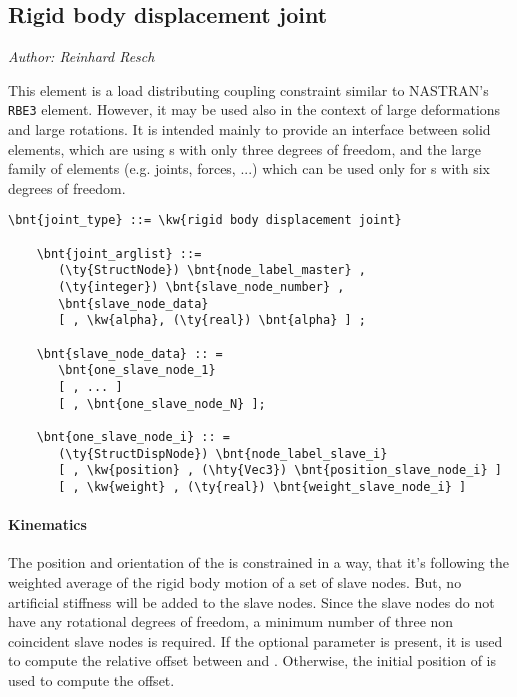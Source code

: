 \subsection{Rigid body displacement joint}
\label{sec:EL:STRUCT:JOINT:RIGID_BODY_DISP_JOINT}
\emph{Author: Reinhard Resch}

This element is a load distributing coupling constraint similar to NASTRAN's \texttt{RBE3} element.
However, it may be used also in the context of large deformations and large rotations.
It is intended mainly to provide an interface between solid elements, which are using s with only three degrees of freedom,
and the large family of elements (e.g. joints, forces, ...) which can be used only for s with six degrees of freedom.

\begin{Verbatim}[commandchars=\\\{\}]
    \bnt{joint_type} ::= \kw{rigid body displacement joint}

    \bnt{joint_arglist} ::=
       (\ty{StructNode}) \bnt{node_label_master} ,
       (\ty{integer}) \bnt{slave_node_number} ,
       \bnt{slave_node_data}
       [ , \kw{alpha}, (\ty{real}) \bnt{alpha} ] ;

    \bnt{slave_node_data} :: =
       \bnt{one_slave_node_1}
       [ , ... ]
       [ , \bnt{one_slave_node_N} ];

    \bnt{one_slave_node_i} :: =
       (\ty{StructDispNode}) \bnt{node_label_slave_i}
       [ , \kw{position} , (\hty{Vec3}) \bnt{position_slave_node_i} ]    
       [ , \kw{weight} , (\ty{real}) \bnt{weight_slave_node_i} ]

\end{Verbatim}

\paragraph{Kinematics}
The position and orientation of the  is constrained in a way, that it's following the weighted average
of the rigid body motion of a set of  slave nodes. But, no artificial stiffness will be added to the slave nodes.
Since the slave nodes do not have any rotational degrees of freedom, a minimum number of three non coincident slave nodes is required.
If the optional parameter  is present, it is used to compute the relative offset between 
and . Otherwise, the initial position of  is used to compute the offset.
